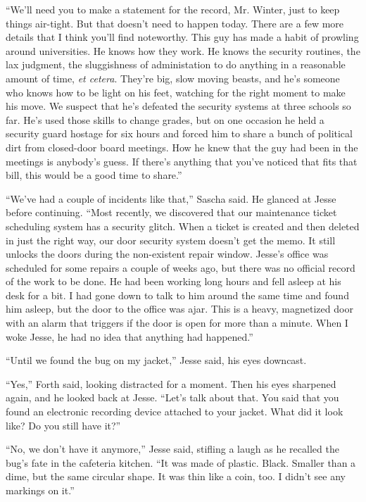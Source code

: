 \documentclass[12pt]{book}
\begin{document}
``We'll need you to make a statement for the record, Mr. Winter, just to keep things air-tight.  But that doesn't need to happen today.  There are a few more details that I think you'll find noteworthy.  This guy has made a habit of prowling around universities.  He knows how they work.  He knows the security routines, the lax judgment, the sluggishness of administation to do anything in a reasonable amount of time, \emph{et cetera}.  They're big, slow moving beasts, and he's someone who knows how to be light on his feet, watching for the right moment to make his move.  We suspect that he's defeated the security systems at three schools so far.  He's used those skills to change grades, but on one occasion he held a security guard hostage for six hours and forced him to share a bunch of political dirt from closed-door board meetings.  How he knew that the guy had been in the meetings is anybody's guess.  If there's anything that you've noticed that fits that bill, this would be a good time to share.''

``We've had a couple of incidents like that,'' Sascha said.  He glanced at Jesse before continuing.  ``Most recently, we discovered that our maintenance ticket scheduling system has a security glitch.  When a ticket is created and then deleted in just the right way, our door security system doesn't get the memo.  It still unlocks the doors during the non-existent repair window.  Jesse's office was scheduled for some repairs a couple of weeks ago, but there was no official record of the work to be done.  He had been working long hours and fell asleep at his desk for a bit.  I had gone down to talk to him around the same time and found him asleep, but the door to the office was ajar.  This is a heavy, magnetized door with an alarm that triggers if the door is open for more than a minute.  When I woke Jesse, he had no idea that anything had happened.''

``Until we found the bug on my jacket,'' Jesse said, his eyes downcast.

``Yes,'' Forth said, looking distracted for a moment.  Then his eyes sharpened again, and he looked back at Jesse.  ``Let's talk about that.  You said that you found an electronic recording device attached to your jacket.  What did it look like?  Do you still have it?''

``No, we don't have it anymore,'' Jesse said, stifling a laugh as he recalled the bug's fate in the cafeteria kitchen.  ``It was made of plastic.  Black.  Smaller than a dime, but the same circular shape.  It was thin like a coin, too.  I didn't see any markings on it.''
\end{document}
